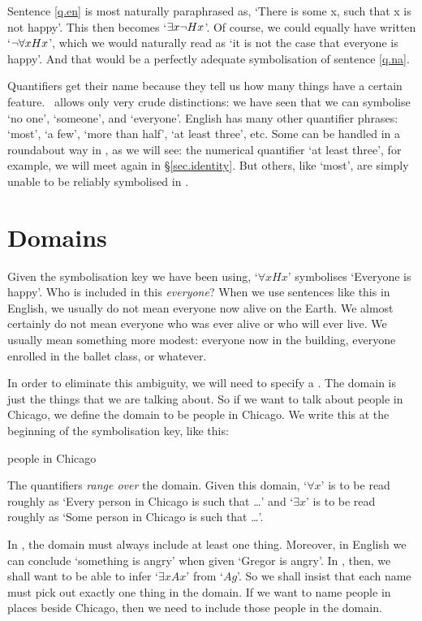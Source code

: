 Sentence \ref{q.en} is most naturally paraphrased as, `There is some x, such that x is not happy'. This then becomes `$\exists x \neg Hx$'. Of course, we could equally have written `$\neg\forall x Hx$', which we would naturally read as `it is not the case that everyone is happy'. And that would be a perfectly adequate symbolisation of sentence \ref{q.na}.

Quantifiers get their name because they tell us how many things have a certain feature. \FOL\ allows only very crude distinctions: we have seen that we can symbolise `no one', `someone', and `everyone'. English has many other quantifier phrases: `most', `a few', `more than half', `at least three', etc. Some can be handled in a roundabout way in \FOL, as we will see: the numerical quantifier `at least three', for example, we will meet again in §\ref{sec.identity}. But others, like `most', are simply unable to be reliably symbolised in \FOL. 

\section{Domains}\label{sec_domains}
Given the symbolisation key we have been using, `$\forall xHx$' symbolises `Everyone is happy'.  Who is included in this \emph{everyone}? When we use sentences like this in English, we usually do not mean everyone now alive on the Earth. We almost certainly do not mean everyone who was ever alive or who will ever live. We usually mean something more modest: everyone now in the building, everyone enrolled in the ballet class, or whatever.

In order to eliminate this ambiguity, we will need to specify a . The domain is just the things that we are talking about. So if we want to talk about people in Chicago, we define the domain to be people in Chicago. We write this at the beginning of the symbolisation key, like this:
	\begin{ekey}
		\item[\domain] people in Chicago
	\end{ekey}
The quantifiers \emph{range over} the domain. Given this domain, `$\forall x$' is to be read roughly as `Every person in Chicago is such that …' and `$\exists x$' is to be read roughly as `Some person in Chicago is such that …'. 

In \FOL, the domain must always include at least one thing. Moreover, in English we can conclude `something is angry' when given `Gregor is angry'. In \FOL, then, we shall want to be able to infer `$\exists x Ax$' from `$Ag$'. So we shall insist that each name must pick out exactly one thing in the domain. If we want to name people in places beside Chicago, then we need to include those people in the domain. 

